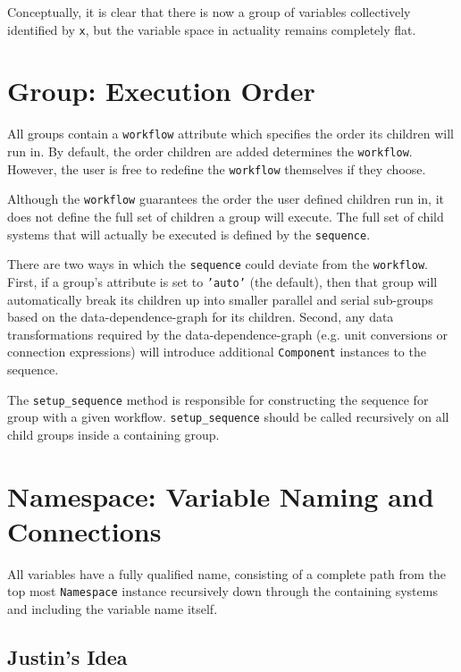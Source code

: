 \documentclass[12pt]{article}
\newcommand{\classname}[1]{\texttt{#1}}
\newcommand{\method}[1]{\texttt{#1}}
\begin{document}
Conceptually, it is clear that there is now a group of variables collectively
identified by \texttt{x}, but the variable space in actuality remains completely
flat.

\section{Group: Execution Order}
All groups contain a \texttt{workflow} attribute which specifies the order its children will run in.
By default, the order children are added determines the \texttt{workflow}.
However, the user is free to redefine the \texttt{workflow} themselves if they choose.

Although the \texttt{workflow} guarantees the order the user defined children run in, it
does not define the full set of children a group will execute. The full set of
child systems that will actually be executed is defined by the \texttt{sequence}.

There are two ways in which the \texttt{sequence} could deviate from the \texttt{workflow}.
First, if a group's  attribute is set to \texttt{'auto'} (the default),
then that group will automatically break its children up into smaller parallel and serial sub-groups
based on the data-dependence-graph for its children. Second, any data transformations required by the
data-dependence-graph (e.g. unit conversions or connection expressions) will introduce additional
\classname{Component} instances to the sequence.

The \method{setup\_sequence} method is responsible for constructing the sequence for group with a
given workflow. \method{setup\_sequence} should be called recursively on all child groups inside a
containing group.

\section{Namespace: Variable Naming and Connections}
All variables have a fully qualified name, consisting of a complete path from the top most
\classname{Namespace} instance recursively down through the containing systems and including
the variable name itself.

\subsection{Justin's Idea}
\end{document}
